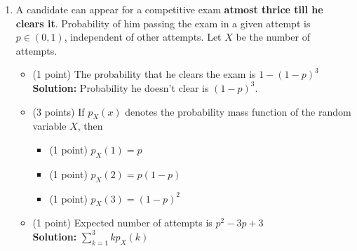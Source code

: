 \documentclass[11pt]{article}
\newcommand{\bkt}[1]{\left( #1\right)}
\newcommand{\dsum}{\displaystyle\sum}
\newcommand{\dcap}{\displaystyle\cap}
\newcommand{\Pb}{\mathbb{P}}
\newcommand{\point}{(1 point) }
\newcommand{\points}[1]{(#1 points) }
\newcommand{\fillans}[1]{\hfill$\boxed{#1}$}
\newcommand{\soln}[1]{\textbf{Solution:} #1}
\begin{document}
\begin{enumerate}
\begin{itemize}
		\item
		\point
		$\Pb\bkt{\mathbf{B \dcap C}}$ \fillans{2/8}
		\item
		\point
		$\Pb\bkt{\mathbf{A \dcap B^c}}$ \fillans{1/8}
		\item
		\point
		$\Pb\bkt{\mathbf{A^c \dcap C^c}}$ \fillans{3/8}
	\end{itemize}
	\item
	A candidate can appear for a competitive exam \textbf{atmost thrice till he clears it}. Probability of him passing the exam in a given attempt is $p \in (0,1)$, independent of other attempts. Let $X$ be the number of attempts.
	\begin{itemize}
		\item
		\point The probability that he clears the exam is \fillans{1-\bkt{1-p}^3}\\
		\soln{Probability he doesn't clear is $(1-p)^3$.}
		\item
		\points{3} If $p_X(x)$ denotes the probability mass function of the random variable $X$, then
		\begin{itemize}
			\item
			\point $p_X(1) = $\fillans{p}
			\item
			\point $p_X(2) = $\fillans{p(1-p)}
			\item
			\point $p_X(3) = $\fillans{(1-p)^2}
		\end{itemize}
		\item
		\point Expected number of attempts is \fillans{p^2-3p+3}\\
		\soln{$\dsum_{k=1}^3 k p_X(k)$}
	\end{itemize}
\end{enumerate}
\end{document}
